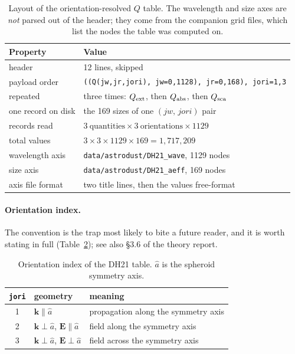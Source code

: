 \documentclass{my_memo}
\newcommand{\code}[1]{\texttt{#1}}
\begin{document}
\begin{table}[h]
\centering
\begin{tabular}{@{}ll@{}}
\toprule
Property & Value \\
\midrule
header                & 12 lines, skipped \\
payload order         & \code{((Q(jw,jr,jori), jw=0,1128), jr=0,168), jori=1,3} \\
repeated              & three times: $Q_{\rm ext}$, then $Q_{\rm abs}$, then $Q_{\rm sca}$ \\
one record on disk    & the 169 sizes of one $(jw,\,jori)$ pair \\
records read          & $3~\text{quantities}\times3~\text{orientations}\times1129$ \\
total values          & $3\times3\times1129\times169 = 1{,}717{,}209$ \\
wavelength axis       & \code{data/astrodust/DH21\_wave}, 1129 nodes \\
size axis             & \code{data/astrodust/DH21\_aeff}, 169 nodes \\
axis file format      & two title lines, then the values free-format \\
\bottomrule
\end{tabular}
\caption{Layout of the orientation-resolved $Q$ table. The wavelength and size
axes are \emph{not} parsed out of the header; they come from the companion grid
files, which list the nodes the table was computed on.}
\label{tab:filelayout}
\end{table}

\paragraph{Orientation index.} The convention is the trap most likely to bite a
future reader, and it is worth stating in full (Table~\ref{tab:jori}); see also
\S3.6 of the theory report.

\begin{table}[h]
\centering
\begin{tabular}{@{}cll@{}}
\toprule
\code{jori} & geometry & meaning \\
\midrule
1 & $\mathbf{k}\parallel\hat{a}$        & propagation along the symmetry axis \\
2 & $\mathbf{k}\perp\hat{a}$, $\mathbf{E}\parallel\hat{a}$ & field along the symmetry axis \\
3 & $\mathbf{k}\perp\hat{a}$, $\mathbf{E}\perp\hat{a}$     & field across the symmetry axis \\
\bottomrule
\end{tabular}
\caption{Orientation index of the DH21 table. $\hat{a}$ is the spheroid
symmetry axis.}
\label{tab:jori}
\end{table}
\end{document}
